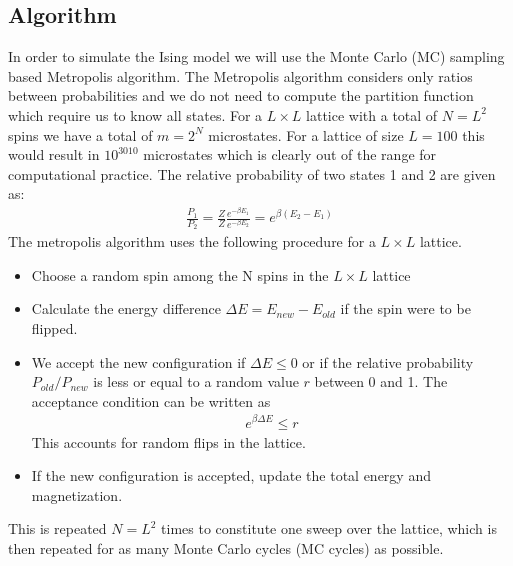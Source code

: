 \documentclass[%
 reprint,
nofootinbib,
aps,
]{revtex4-1}
\begin{document}
\subsection{Algorithm}
In order to simulate the Ising model we will use the Monte Carlo (MC) sampling based Metropolis algorithm. The Metropolis algorithm considers only ratios between probabilities and we do not need to compute the partition function which require us to know all states. For a $L\times L$ lattice with a total of $N=L^2$ spins we have a total of $m=2^N$ microstates. For a lattice of size $L = 100$ this would result in $10^{3010}$ microstates which is clearly out of the range for computational practice. The relative probability of two states 1 and 2 are given as:
\begin{align*}
    \frac{P_1}{P_2} = \frac{Z}{Z} \frac{e^{-\beta E_1}}{e^{-\beta E_2}} = e^{\beta (E_2 - E_1)}
\end{align*}
The metropolis algorithm uses the following procedure for a $L\times L$ lattice.
\begin{itemize}
    \item Choose a random spin among the N spins in the $L\times L$ lattice
    \item Calculate the energy difference $\Delta E = E_{new} - E_{old}$ if the spin were to be flipped.
    \item We accept the new configuration if $\Delta E \leq 0$ or if the relative probability $P_{old}/P_{new}$ is less or equal to a random value $r$ between 0 and 1. The acceptance condition can be written as
    \begin{align*}
        e^{\beta \Delta E} \leq r
    \end{align*}
    This accounts for random flips in the lattice.
    \item If the new configuration is accepted, update the total energy and magnetization.
\end{itemize}
This is repeated $N=L^2$ times to constitute one sweep over the lattice, which is then repeated for as many Monte Carlo cycles (MC cycles) as possible.
\newpage
\end{document}
